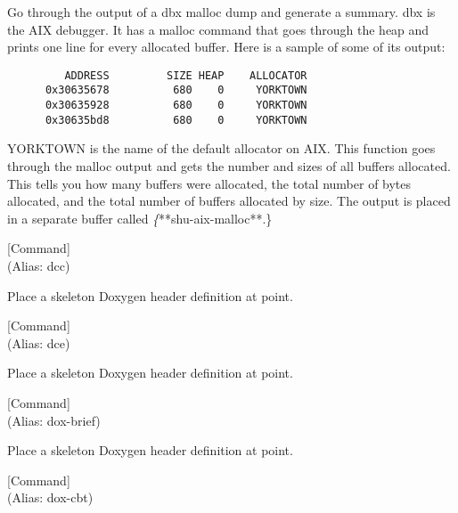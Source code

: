 \begin{doc-string}
Go through the output of a dbx malloc dump and generate a summary.  dbx is
the AIX debugger.  It has a malloc command that goes through the heap and prints
one line for every allocated buffer.  Here is a sample of some of its output:

\begin{verbatim}
         ADDRESS         SIZE HEAP    ALLOCATOR
      0x30635678          680    0     YORKTOWN
      0x30635928          680    0     YORKTOWN
      0x30635bd8          680    0     YORKTOWN
\end{verbatim}

YORKTOWN is the name of the default allocator on AIX.  This function goes
through the malloc output and gets the number and sizes of all buffers
allocated.  This tells you how many buffers were allocated, the total number of
bytes allocated, and the total number of buffers allocated by size.  The output
is placed in a separate buffer called \emph\{**shu-aix-malloc**.\}
\end{doc-string}

\vspace{1em}
\noindent
{}
\usebox{\funcname}
 \hfill [Command]\\%
 (Alias: dcc)

\begin{doc-string}
Place a skeleton Doxygen header definition at point.
\end{doc-string}

\vspace{1em}
\noindent
{}
\usebox{\funcname}
 \hfill [Command]\\%
 (Alias: dce)

\begin{doc-string}
Place a skeleton Doxygen header definition at point.
\end{doc-string}

\vspace{1em}
\noindent
{}
\usebox{\funcname}
 \hfill [Command]\\%
 (Alias: dox-brief)

\begin{doc-string}
Place a skeleton Doxygen header definition at point.
\end{doc-string}

\vspace{1em}
\noindent
{}
\usebox{\funcname}
 \hfill [Command]\\%
 (Alias: dox-cbt)


